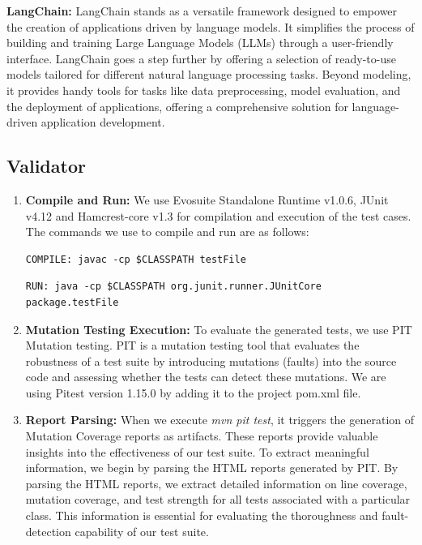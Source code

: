 \begin{enumerate}
    \textbf{LangChain:} LangChain\cite{langchain} stands as a versatile framework designed to empower the creation of applications driven by language models. It simplifies the process of building and training Large Language Models (LLMs) through a user-friendly interface. LangChain goes a step further by offering a selection of ready-to-use models tailored for different natural language processing tasks. Beyond modeling, it provides handy tools for tasks like data preprocessing, model evaluation, and the deployment of applications, offering a comprehensive solution for language-driven application development.
\end{enumerate}
    
\vspace{0.1 cm}
\subsection{Validator}
\label{sec:validator_implementation}
\vspace{0.1 cm}

\begin{enumerate}
    \item \textbf{Compile and Run:} 
    We use Evosuite Standalone Runtime v1.0.6\cite{noauthor_evosuite-standalone-runtime106_nodate}, JUnit v4.12\cite{noauthor_junit4.12_nodate} and Hamcrest-core v1.3\cite{noauthor_javaHamcrest_nodate} for compilation and execution of the test cases. The commands we use to compile and run are as follows:
    
\begin{verbatim}
COMPILE: javac -cp $CLASSPATH testFile
\end{verbatim}
\begin{verbatim}
RUN: java -cp $CLASSPATH org.junit.runner.JUnitCore package.testFile
\end{verbatim}

    \item \textbf{Mutation Testing Execution:} To evaluate the generated tests, we use PIT\cite{noauthor_pit_nodate} Mutation testing. PIT is a mutation testing tool that evaluates the robustness of a test suite by introducing mutations (faults) into the source code and assessing whether the tests can detect these mutations. We are using Pitest version 1.15.0\cite{noauthor_maven_nodate} by adding it to the project pom.xml file.
    
    \item \textbf{Report Parsing:} When we execute \textit{mvn pit test}, it triggers the generation of Mutation Coverage reports as artifacts. These reports provide valuable insights into the effectiveness of our test suite. To extract meaningful information, we begin by parsing the HTML reports generated by PIT. By parsing the HTML reports, we extract detailed information on line coverage, mutation coverage, and test strength for all tests associated with a particular class. This information is essential for evaluating the thoroughness and fault-detection capability of our test suite.
\end{enumerate}
